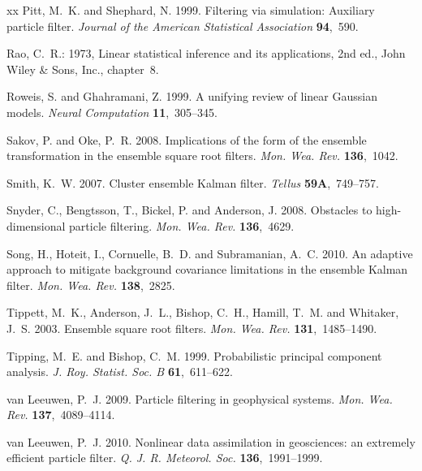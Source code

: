 \documentclass[useAMS,usenatbib]{tellus}
\begin{document}
\begin{thebibliography}{xx}
Pitt, M.~K. and Shephard, N. 1999. {Filtering via simulation: Auxiliary
  particle filter}. {\em {Journal of the American Statistical Association}}
  {\bf 94},~590.

Rao, C.~R.: 1973, {Linear statistical inference and its applications, 2nd ed.},
  {John Wiley \& Sons, Inc.}, chapter~8.

Roweis, S. and Ghahramani, Z. 1999. {A unifying review of linear Gaussian
  models}. {\em Neural Computation} {\bf 11},~305--345.

Sakov, P. and Oke, P.~R. 2008. {Implications of the form of the ensemble
  transformation in the ensemble square root filters}. {\em Mon. Wea. Rev.}
  {\bf 136},~1042.

Smith, K.~W. 2007. {Cluster ensemble Kalman filter}. {\em {Tellus}} {\bf
  59A},~749--757.

Snyder, C., Bengtsson, T., Bickel, P. and Anderson, J. 2008. {Obstacles to
  high-dimensional particle filtering}. {\em Mon. Wea. Rev.} {\bf 136},~4629.

Song, H., Hoteit, I., Cornuelle, B.~D. and Subramanian, A.~C. 2010. {An
  adaptive approach to mitigate background covariance limitations in the
  ensemble Kalman filter}. {\em Mon. Wea. Rev.} {\bf 138},~2825.

Tippett, M.~K., Anderson, J.~L., Bishop, C.~H., Hamill, T.~M. and Whitaker,
  J.~S. 2003. {Ensemble square root filters}. {\em Mon. Wea. Rev.} {\bf
  131},~1485--1490.

Tipping, M.~E. and Bishop, C.~M. 1999. {Probabilistic principal component
  analysis}. {\em {J. Roy. Statist. Soc. B}} {\bf 61},~611--622.

van Leeuwen, P.~J. 2009. {Particle filtering in geophysical systems}. {\em Mon.
  Wea. Rev.} {\bf 137},~4089--4114.

van Leeuwen, P.~J. 2010. {Nonlinear data assimilation in geosciences: an
  extremely efficient particle filter}. {\em Q. J. R. Meteorol. Soc.} {\bf
  136},~1991--1999.


\end{thebibliography}
\end{document}
